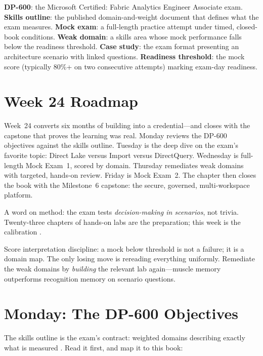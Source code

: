 \begin{keyterms}
\textbf{DP-600}: the Microsoft Certified: Fabric Analytics Engineer Associate exam. \quad
\textbf{Skills outline}: the published domain-and-weight document that defines what the exam measures. \quad
\textbf{Mock exam}: a full-length practice attempt under timed, closed-book conditions. \quad
\textbf{Weak domain}: a skills area whose mock performance falls below the readiness threshold. \quad
\textbf{Case study}: the exam format presenting an architecture scenario with linked questions. \quad
\textbf{Readiness threshold}: the mock score (typically 80\%+ on two consecutive attempts) marking exam-day readiness.
\end{keyterms}

\section{Week 24 Roadmap}
Week~24 converts six months of building into a credential---and closes with the capstone that proves the learning was real. Monday reviews the DP-600 objectives against the skills outline. Tuesday is the deep dive on the exam's favorite topic: Direct Lake versus Import versus DirectQuery. Wednesday is full-length Mock Exam~1, scored by domain. Thursday remediates weak domains with targeted, hands-on review. Friday is Mock Exam~2. The chapter then closes the book with the Milestone~6 capstone: the secure, governed, multi-workspace platform.

A word on method: the exam tests \emph{decision-making in scenarios}, not trivia. Twenty-three chapters of hands-on labs are the preparation; this week is the calibration \cite{microsoftDp600}.

\begin{notebox}
Score interpretation discipline: a mock below threshold is not a failure; it is a domain map. The only losing move is rereading everything uniformly. Remediate the weak domains by \emph{building} the relevant lab again---muscle memory outperforms recognition memory on scenario questions.
\end{notebox}

\section{Monday: The DP-600 Objectives}
The skills outline is the exam's contract: weighted domains describing exactly what is measured \cite{microsoftDp600}. Read it first, and map it to this book:


